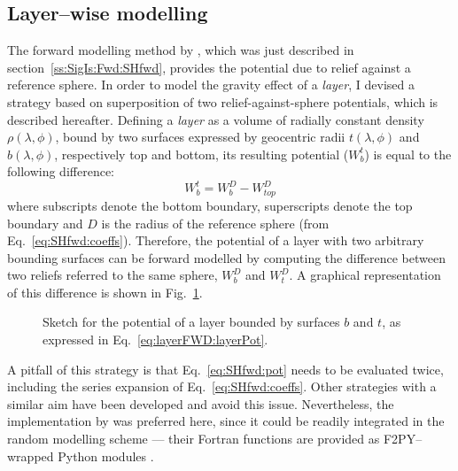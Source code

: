 
\subsection{Layer--wise modelling}
\label{ss:SigIs:Fwd:LayerFwd}
The forward modelling method by \textcite{Wieczorek2007}, which was just described in section~\ref{ss:SigIs:Fwd:SHfwd}, provides the potential due to relief against a reference sphere.
In order to model the gravity effect of a \textit{layer}, I devised a strategy based on superposition of two relief-against-sphere potentials, which is described hereafter.
Defining a \textit{layer} as a volume of radially constant density $\rho(\lambda, \phi)$, bound by two surfaces expressed by geocentric radii $t(\lambda, \phi)$ and $b(\lambda, \phi)$, respectively top and bottom, its resulting potential ($W_{b}^{t}$) is equal to the following difference:
\begin{equation}
    \label{eq:layerFWD:layerPot}
    W_{b}^{t} = W_{b}^{D} - W_{top}^{D}
\end{equation}
where subscripts denote the bottom boundary, superscripts denote the top boundary and $D$ is the radius of the reference sphere (from Eq.~\ref{eq:SHfwd:coeffs}).
Therefore, the potential of a layer with two arbitrary bounding surfaces can be forward modelled by computing the difference between two reliefs referred to the same sphere, $W_{b}^{D}$ and $W_{t}^{D}$.
A graphical representation of this difference is shown in Fig.~\ref{fig:SigIs:LayerDifference}.

\begin{figure}
    \begin{adjustbox}{center}
    \end{adjustbox}
    \caption[Sketch for the potential of a layer.]{
        Sketch for the potential of a layer bounded by surfaces $b$ and $t$, as expressed in Eq.~\ref{eq:layerFWD:layerPot}.}
    \label{fig:SigIs:LayerDifference}
\end{figure}

A pitfall of this strategy is that Eq.~\ref{eq:SHfwd:pot} needs to be evaluated twice, including the series expansion of Eq.~\ref{eq:SHfwd:coeffs}.
Other strategies with a similar aim have been developed \parencite[e.g.][]{Novak2006} and avoid this issue.
Nevertheless, the implementation by \textcite{Wieczorek2018} was preferred here, since it could be readily integrated in the random modelling scheme --- their Fortran functions are provided as {F2PY}--wrapped Python modules \parencite{Peterson2009}.

